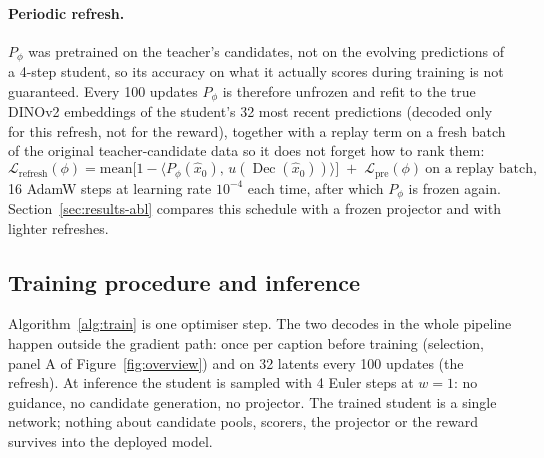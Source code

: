 \documentclass{article} %
\DeclareMathOperator{\Dec}{Dec}
\begin{document}
\paragraph{Periodic refresh.} $P_\phi$ was pretrained on the teacher's candidates, not on the evolving
predictions of a 4-step student, so its accuracy on what it actually scores during training is not
guaranteed. Every 100 updates $P_\phi$ is therefore unfrozen and refit to the true DINOv2 embeddings of the
student's 32 most recent predictions (decoded only for this refresh, not for the reward), together with a
replay term on a fresh batch of the original teacher-candidate data so it does not forget how to rank them:
\begin{equation}
\mathcal L_{\mathrm{refresh}}(\phi)=\mathrm{mean}\big[1-\langle P_\phi(\hat x_0),\,u(\Dec(\hat x_0))\rangle\big]\;+\;\mathcal L_{\mathrm{pre}}(\phi)\ \text{on a replay batch},
\label{eq:refresh}
\end{equation}
16 AdamW steps at learning rate $10^{-4}$ each time, after which $P_\phi$ is frozen again. Section~\ref{sec:results-abl}
compares this schedule with a frozen projector and with lighter refreshes.

\subsection{Training procedure and inference}
\label{sec:pseudocode}
Algorithm~\ref{alg:train} is one optimiser step. The two decodes in the whole pipeline happen outside the
gradient path: once per caption before training (selection, panel A of Figure~\ref{fig:overview}) and on
32 latents every 100 updates (the refresh). At inference the student is sampled with 4 Euler steps at
$w{=}1$: no guidance, no candidate generation, no projector. The trained student is a single network; nothing
about candidate pools, scorers, the projector or the reward survives into the deployed model.
\end{document}
